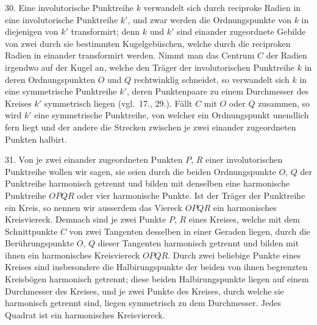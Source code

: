 30. Eine involutorische Punktreihe $k$ verwandelt sich
durch reciproke Radien in eine involutorische Punktreihe $k'$,
und zwar werden die Ordnungspunkte von $k$ in diejenigen
von $k'$ transformirt; denn $k$ und $k'$ sind einander zugeordnete
Gebilde von zwei durch sie bestimmten Kugelgeb\"uschen,
welche durch die reciproken Radien in einander transformirt
werden. Nimmt man das Centrum $C$ der Radien irgendwo
auf der Kugel an, welche den Tr\"ager der involutorischen
Punktreihe $k$ in deren Ordnungspunkten $O$ und $Q$ rechtwinklig
schneidet, so verwandelt sich $k$ in eine symmetrische
Punktreihe $k'$, deren Punktenpaare zu einem Durchmesser
des Kreises $k'$ symmetrisch liegen (vgl.\ 17., 29.). F\"allt $C$
mit $O$ oder $Q$ zusammen, so wird $k'$ eine  symmetrische
Punktreihe, von welcher ein Ordnungspunkt unendlich
fern liegt und der andere die Strecken zwischen je zwei
einander zugeordneten Punkten halbirt.

\enlargethispage{-\baselineskip}
\begin{center}
\makebox[15em]{\hrulefill}\bigskip
\end{center}

\label{p4}


\hspace{\parindent}%
31. Von je zwei einander zugeordneten Punkten $P$, $R$
einer involutorischen Punktreihe wollen wir sagen, sie seien
durch die beiden Ordnungspunkte $O$, $Q$ der Punktreihe {\glqq}harmonisch
getrennt{\grqq} und bilden mit denselben eine harmonische
Punktreihe $OPQR$ oder {\glqq}vier harmonische Punkte{\grqq}.
Ist der Tr\"ager der Punktreihe ein Kreis, so nennen wir
ausserdem das Viereck $OPQR$ ein {\glqq}harmonisches Kreisviereck{\grqq}.
Demnach sind je zwei Punkte $P$, $R$ eines Kreises,
welche mit dem Schnittpunkte $C$ von zwei Tangenten desselben
in einer Geraden liegen, durch die Ber\"uhrungspunkte
$O$, $Q$ dieser Tangenten harmonisch getrennt und bilden mit
ihnen ein harmonisches Kreisviereck $OPQR$. Durch zwei
beliebige Punkte eines Kreises sind insbesondere die Halbirungspunkte
der beiden von ihnen begrenzten Kreisb\"ogen
harmonisch getrennt; diese beiden Halbirungspunkte liegen
auf einem Durchmesser des Kreises, und je zwei Punkte des
Kreises, durch welche sie harmonisch getrennt sind, liegen
symmetrisch zu dem Durchmesser. Jedes Quadrat ist ein
harmonisches Kreisviereck.

